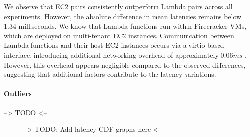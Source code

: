 We observe that EC2 pairs consistently outperform Lambda pairs across all experiments. However, the absolute difference in mean latencies remains below 1.34 milliseconds. We know that Lambda functions run within Firecracker VMs, which are deployed on multi-tenant EC2 instances. Communication between Lambda functions and their host EC2 instances occurs via a virtio-based interface, introducing additional networking overhead of approximately $0.06ms$ \cite{}. However, this overhead appears negligible compared to the observed differences, suggesting that additional factors contribute to the latency variations.

\paragraph*{Outliers}
--> TODO <--

\begin{figure}[h]
	\caption{--> TODO: Add latency CDF graphs here <--}
\end{figure}

